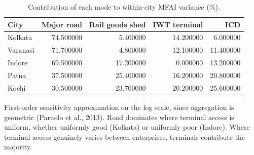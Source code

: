 \begin{table}[htbp]
\centering
\small
\caption{Contribution of each mode to within-city MFAI variance (\%).}
\label{tab:t9_variance_modes}
\begin{tabular}{lrrrr}
\toprule
City & Major road & Rail goods shed & IWT terminal & ICD \\
\midrule
Kolkata & 74.500000 & 5.400000 & 14.200000 & 6.000000 \\
Varanasi & 71.700000 & 4.800000 & 12.100000 & 11.400000 \\
Indore & 69.500000 & 17.200000 & 0.000000 & 13.200000 \\
Patna & 37.500000 & 25.400000 & 16.200000 & 20.800000 \\
Kochi & 30.500000 & 23.700000 & 20.200000 & 25.600000 \\
\bottomrule
\end{tabular}
\begin{tablenotes}\footnotesize
\item First-order sensitivity approximation on the log scale, since aggregation is geometric (Paruolo et al., 2013). Road dominates where terminal access is uniform, whether uniformly good (Kolkata) or uniformly poor (Indore). Where terminal access genuinely varies between enterprises, terminals contribute the majority.
\end{tablenotes}
\end{table}

